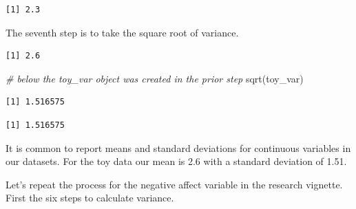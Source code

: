 \documentclass[
  11pt,
]{book}
\newenvironment{Shaded}{\begin{snugshade}}{\end{snugshade}}
\newcommand{\CommentTok}[1]{\textcolor[rgb]{0.56,0.35,0.01}{\textit{#1}}}
\newcommand{\FunctionTok}[1]{\textcolor[rgb]{0.00,0.00,0.00}{#1}}
\newcommand{\NormalTok}[1]{#1}
\newcommand{\SpecialCharTok}[1]{\textcolor[rgb]{0.00,0.00,0.00}{#1}}
\begin{document}
\begin{verbatim}
[1] 2.3
\end{verbatim}

The seventh step is to take the square root of variance.

\begin{Shaded}
\end{Shaded}

\begin{verbatim}
[1] 2.6
\end{verbatim}

\begin{Shaded}
\begin{Highlighting}[]
\CommentTok{\# below the \textquotesingle{}toy\_var\textquotesingle{} object was created in the prior step}
\FunctionTok{sqrt}\NormalTok{(toy\_var)}
\end{Highlighting}
\end{Shaded}

\begin{verbatim}
[1] 1.516575
\end{verbatim}

\begin{Shaded}
\end{Shaded}

\begin{verbatim}
[1] 1.516575
\end{verbatim}

It is common to report means and standard deviations for continuous variables in our datasets. For the toy data our mean is 2.6 with a standard deviation of 1.51.

Let's repeat the process for the negative affect variable in the research vignette. First the six steps to calculate variance.
\end{document}
